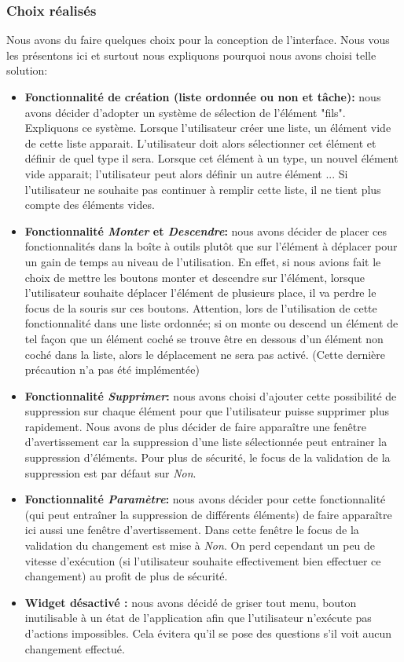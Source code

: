 \documentclass[a4paper,10pt]{article}
\begin{document}
\subsubsection{Choix réalisés}
Nous avons du faire quelques choix pour la conception de l'interface. Nous vous les présentons ici et surtout nous expliquons pourquoi nous avons choisi telle solution:
\begin{itemize}
\item \textbf{Fonctionnalité de création (liste ordonnée ou non et tâche):} nous avons décider d'adopter un système de sélection de l'élément "fils". Expliquons ce système. Lorsque l'utilisateur créer une liste, un élément vide de cette liste apparait. L'utilisateur doit alors sélectionner cet élément et définir de quel type il sera. Lorsque cet élément à un type, un nouvel élément vide apparait; l'utilisateur peut alors définir un autre élément ... Si l'utilisateur ne souhaite pas continuer à remplir cette liste, il ne tient plus compte des éléments vides.
\item \textbf{Fonctionnalité \textit{Monter} et \textit{Descendre}:} nous avons décider de placer ces fonctionnalités dans la boîte à outils plutôt que sur l'élément à déplacer pour un gain de temps au niveau de l'utilisation. En effet, si nous avions fait le choix de mettre les boutons monter et descendre sur l'élément, lorsque l'utilisateur souhaite déplacer l'élément de plusieurs place, il va perdre le focus de la souris sur ces boutons. Attention, lors de l'utilisation de cette fonctionnalité dans une liste ordonnée; si on monte ou descend un élément de tel façon que un élément coché se trouve être en dessous d'un élément non coché dans la liste, alors le déplacement ne sera pas activé. (Cette dernière précaution n'a pas été implémentée)
\item \textbf{Fonctionnalité \textit{Supprimer}:} nous avons choisi d'ajouter cette possibilité de suppression sur chaque élément pour que l'utilisateur puisse supprimer plus rapidement. Nous avons de plus décider de faire apparaître une fenêtre d'avertissement car la suppression d'une liste sélectionnée peut entrainer la suppression d'éléments. Pour plus de sécurité, le focus de la validation de la suppression est par défaut sur \textit{Non}.
\item \textbf{Fonctionnalité \textit{Paramètre}:} nous avons décider pour cette fonctionnalité (qui peut entraîner la suppression de différents éléments) de faire apparaître ici aussi une fenêtre d'avertissement. Dans cette fenêtre le focus de la validation du changement est mise à \textit{Non}. On perd cependant un peu de vitesse d'exécution (si l'utilisateur souhaite effectivement bien effectuer ce changement) au profit de plus de sécurité.
\item \textbf{Widget désactivé :} nous avons décidé de griser tout menu, bouton inutilisable à un état de l'application afin que l'utilisateur n'exécute pas d'actions impossibles. Cela évitera qu'il se pose des questions s'il voit aucun changement effectué.
\end{itemize}
\end{document}
